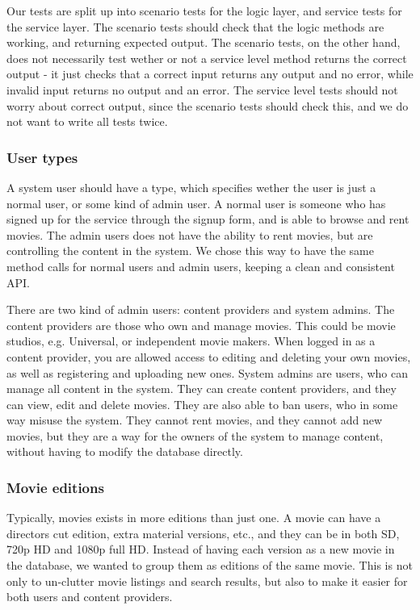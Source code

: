Our tests are split up into scenario tests for the logic layer, and service tests for the service layer. The scenario tests should check that the logic methods are working, and returning expected output. The scenario tests, on the other hand, does not necessarily test wether or not a service level method returns the correct output - it just checks that a correct input returns any output and no error, while invalid input returns no output and an error. The service level tests should not worry about correct output, since the scenario tests should check this, and we do not want to write all tests twice.

\subsubsection{User types}
\label{Design_Service_Analysis_UserTypes}
A system user should have a type, which specifies wether the user is just a normal user, or some kind of admin user. A normal user is someone who has signed up for the service through the signup form, and is able to browse and rent movies. The admin users does not have the ability to rent movies, but are controlling the content in the system. We chose this way to have the same method calls for normal users and admin users, keeping a clean and consistent API. 

There are two kind of admin users: content providers and system admins. The content providers are those who own and manage movies. This could be movie studios, e.g. Universal, or independent movie makers. When logged in as a content provider, you are allowed access to editing and deleting your own movies, as well as registering and uploading new ones. System admins are users, who can manage all content in the system. They can create content providers, and they can view, edit and delete movies. They are also able to ban users, who in some way misuse the system. They cannot rent movies, and they cannot add new movies, but they are a way for the owners of the system to manage content, without having to modify the database directly.

\subsubsection{Movie editions}
\label{Design_Service_Analysis_MovieEditions}
Typically, movies exists in more editions than just one. A movie can have a directors cut edition, extra material versions, etc., and they can be in both SD, 720p HD and 1080p full HD. Instead of having each version as a new movie in the database, we wanted to group them as editions of the same movie. This is not only to un-clutter movie listings and search results, but also to make it easier for both users and content providers.

